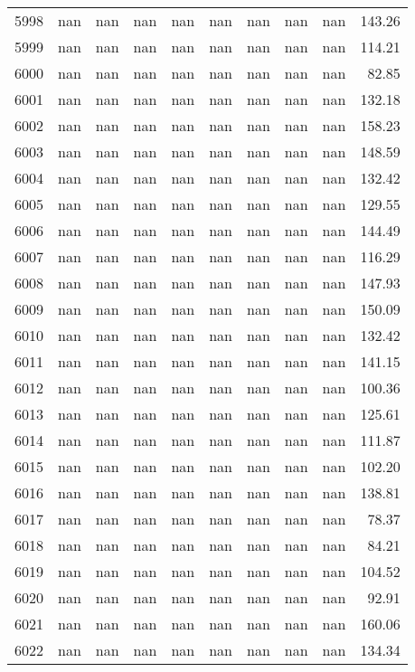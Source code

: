 \begin{tabular}{lrrrrrrrrr}
5998 & nan & nan & nan & nan & nan & nan & nan & nan & 143.26 \\
5999 & nan & nan & nan & nan & nan & nan & nan & nan & 114.21 \\
6000 & nan & nan & nan & nan & nan & nan & nan & nan & 82.85 \\
6001 & nan & nan & nan & nan & nan & nan & nan & nan & 132.18 \\
6002 & nan & nan & nan & nan & nan & nan & nan & nan & 158.23 \\
6003 & nan & nan & nan & nan & nan & nan & nan & nan & 148.59 \\
6004 & nan & nan & nan & nan & nan & nan & nan & nan & 132.42 \\
6005 & nan & nan & nan & nan & nan & nan & nan & nan & 129.55 \\
6006 & nan & nan & nan & nan & nan & nan & nan & nan & 144.49 \\
6007 & nan & nan & nan & nan & nan & nan & nan & nan & 116.29 \\
6008 & nan & nan & nan & nan & nan & nan & nan & nan & 147.93 \\
6009 & nan & nan & nan & nan & nan & nan & nan & nan & 150.09 \\
6010 & nan & nan & nan & nan & nan & nan & nan & nan & 132.42 \\
6011 & nan & nan & nan & nan & nan & nan & nan & nan & 141.15 \\
6012 & nan & nan & nan & nan & nan & nan & nan & nan & 100.36 \\
6013 & nan & nan & nan & nan & nan & nan & nan & nan & 125.61 \\
6014 & nan & nan & nan & nan & nan & nan & nan & nan & 111.87 \\
6015 & nan & nan & nan & nan & nan & nan & nan & nan & 102.20 \\
6016 & nan & nan & nan & nan & nan & nan & nan & nan & 138.81 \\
6017 & nan & nan & nan & nan & nan & nan & nan & nan & 78.37 \\
6018 & nan & nan & nan & nan & nan & nan & nan & nan & 84.21 \\
6019 & nan & nan & nan & nan & nan & nan & nan & nan & 104.52 \\
6020 & nan & nan & nan & nan & nan & nan & nan & nan & 92.91 \\
6021 & nan & nan & nan & nan & nan & nan & nan & nan & 160.06 \\
6022 & nan & nan & nan & nan & nan & nan & nan & nan & 134.34 \\

\end{tabular}
